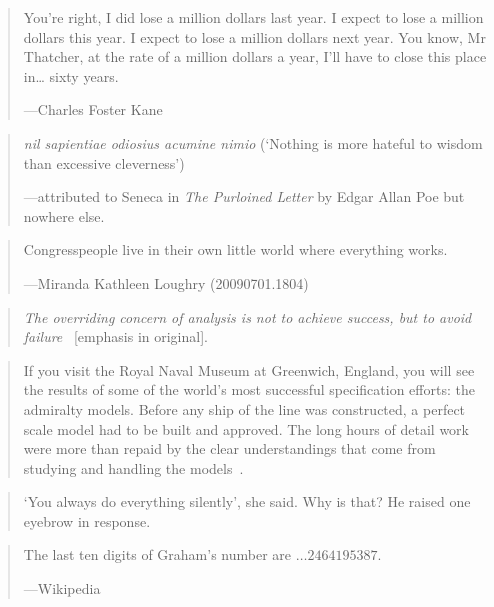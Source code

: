 \documentclass[a4paper]{article}
\begin{document}
\medskip
\begin{quote}
	You're right, I did lose a million dollars last year.  I expect
	to lose a million dollars this year.  I expect to lose a million
	dollars next year.  You know, Mr Thatcher, at the rate of a
	million dollars a year, I'll have to close this place in\ldots
	sixty years.

	---Charles Foster Kane
\end{quote}
	
\medskip
\begin{quote}
	\emph{nil sapientiae odiosius acumine nimio} (`Nothing is more
	hateful to wisdom than excessive cleverness')

	---attributed to Seneca in \emph{The Purloined Letter} by Edgar
	Allan Poe but nowhere else.
\end{quote}

\medskip
\begin{quote}
	Congresspeople live in their own little world where everything
	works.

	---Miranda Kathleen Loughry (20090701.1804)
\end{quote}

\medskip
\begin{quote}
	\emph{The overriding concern of analysis is not to achieve
	success, but to avoid failure}~\citep[p.~9]{DeMarco1978} 
	[emphasis in original].
\end{quote}

\medskip
\begin{quote}
	If you visit the Royal Naval Museum at Greenwich, England, you
	will see the results of some of the world's most successful
	specification efforts: the admiralty models.  Before any ship
	of the line was constructed, a perfect scale model had to be
	built and approved.  The long hours of detail work were more
	than repaid by the clear understandings that come from studying
	and handling the models~\citep[p.~7]{DeMarco1978}.
\end{quote}

\medskip
\begin{quote}
	`You always do everything \guillemotleft silently\guillemotright',
	she said.  Why is that?  He raised one eyebrow in response.
\end{quote}

\medskip
\begin{quote}
	The last ten digits of Graham's number are $\ldots 2464195387$.

	---Wikipedia
\end{quote}
\end{document}
